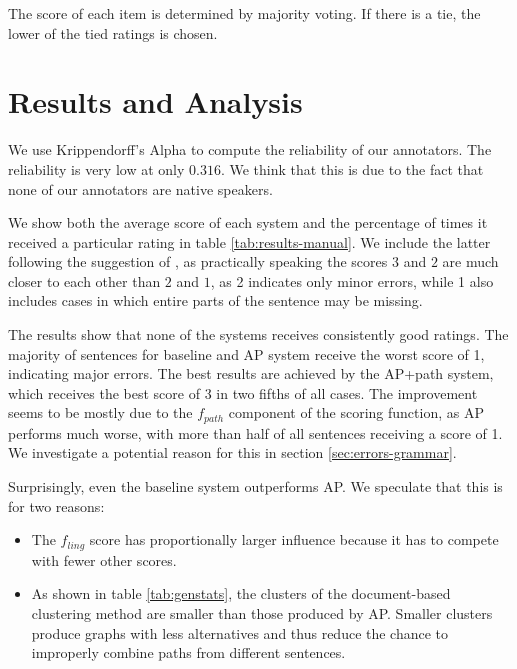 \documentclass[a4paper,BCOR=10mm]{report}
\numberwithin{lemma}{chapter}
\numberwithin{definition}{chapter}
\begin{document}
The score of each item is determined by majority voting. If there is a tie, the lower of the tied ratings is chosen.

\section{Results and Analysis}

We use Krippendorff's Alpha \citep{krippendorff} to compute the reliability of our annotators.
The reliability is very low at only $0.316$. We think that this is due to the fact that none of our annotators are native speakers.

We show both the average score of each system and the percentage of times it received a particular rating in table \ref{tab:results-manual}.
We include the latter following the suggestion of \citet{filippova}, as practically speaking the scores $3$ and $2$ are much closer to each other than $2$ and $1$, as 2 indicates only minor errors, while 1 also includes cases in which entire parts of the sentence may be missing.

The results show that none of the systems receives consistently good ratings. The majority of sentences for baseline and AP system receive the worst score of 1, indicating major errors.
The best results are achieved by the AP+path system, which receives the best score of 3 in two fifths of all cases. The improvement seems to be mostly due to the $f_{path}$ component of the scoring function, as AP performs much worse, with more than half of all sentences receiving a score of 1.
We investigate a potential reason for this in section \ref{sec:errors-grammar}.

Surprisingly, even the baseline system outperforms AP. We speculate that this is for two reasons:

\begin{itemize}
    \item{The $f_{ling}$ score has proportionally larger influence because it has to compete with fewer other scores.}
    \item{As shown in table \ref{tab:genstats}, the clusters of the document-based clustering method are smaller than those produced by AP. Smaller clusters produce graphs with less alternatives and thus reduce the chance to improperly combine paths from different sentences.}
\end{itemize}
\end{document}
